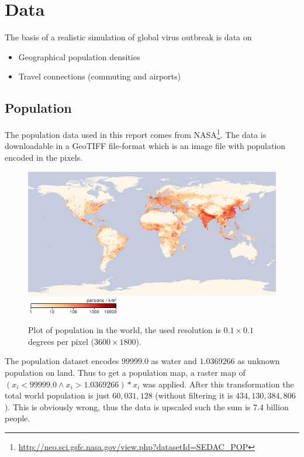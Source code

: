 \section{Data}

The basis of a realistic simulation of global virus outbreak is data on
\begin{itemize}
	\item Geographical population densities
	\item Travel connections (commuting and airports)
\end{itemize}

\subsection{Population}
The population data used in this report comes from NASA\footnote{\url{http://neo.sci.gsfc.nasa.gov/view.php?datasetId=SEDAC\_POP}}. The data is downloadable in a GeoTIFF file-format which is an image file with population encoded in the pixels.

\begin{figure}[H]
	\centering
	\includegraphics[width=1.0 \textwidth]{plots/nasa_population}
	\includegraphics[width=4cm]{plots/nasa_population_colorbar}
	\caption{Plot of population in the world, the used resolution is $0.1 \times 0.1$ degrees per pixel ($3600 \times 1800$).}
\end{figure}

The population dataset encodes $99999.0$ as water and $1.0369266$ as unknown population on land. Thus to get a population map, a raster map of $(x_i < 99999.0 \wedge x_i > 1.0369266) * x_i$ was applied. After this transformation the total world population is just $60,031,128$ (without filtering it is $434,130,384,806$). This is obviously wrong, thus the data is upscaled such the sum is 7.4 billion people.

